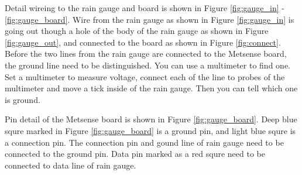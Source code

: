 Detail wireing to the rain gauge and board is shown in Figure \ref{fig:gauge_in} - \ref{fig:gauge_board}. Wire from the rain gauge as shown in Figure \ref{fig:gauge_in} is going out though a hole of the body of the rain gauge as shown in Figure \ref{fig:gauge_out}, and connected to the board as shown in Figure \ref{fig:connect}. Before the two lines from the rain gauge are connected to the Metsense board, the ground line need to be distinguished. You can use a multimeter to find one. Set a multimeter to measure voltage, connect each of the line to probes of the multimeter and move a tick inside of the rain gauge. Then you can tell which one is ground.
\par
Pin detail of the Metsense board is shown in Figure \ref{fig:gauge_board}. Deep blue squre marked in Figure \ref{fig:gauge_board} is a ground pin, and light blue squre is a connection pin. The connection pin and gound line of rain gauge need to be connected to the ground pin. Data pin marked as a red squre need to be connected to data line of rain gauge.


\makeatletter
\setlength{\@fptop}{0pt}
\makeatother


